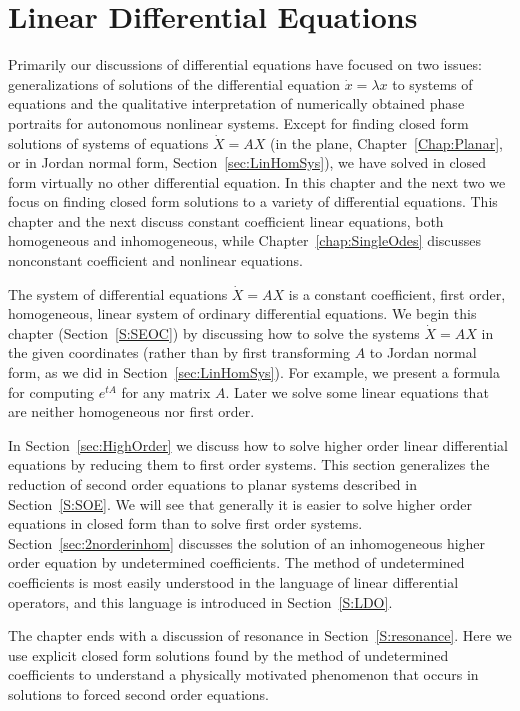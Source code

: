\chapter{Linear Differential Equations}
\label{C:LDE}

\normalsize

Primarily our discussions of differential equations have focused on 
two issues: generalizations of solutions of the differential equation 
$\dot{x}=\lambda x$ to systems of equations and the qualitative 
interpretation of numerically obtained phase portraits for autonomous
nonlinear systems.   Except for finding closed form solutions of 
systems of equations $\dot{X}=AX$ (in the plane, Chapter~\ref{Chap:Planar}, 
or in Jordan normal form, Section~\ref{sec:LinHomSys}), we have solved in 
closed form virtually no other differential equation.  In this chapter and 
the next two we focus on finding closed form solutions to a variety of 
differential equations.  This chapter and the next discuss constant 
coefficient linear equations, both homogeneous and inhomogeneous, 
while Chapter~\ref{chap:SingleOdes} discusses nonconstant coefficient
and nonlinear equations.  

The system of differential equations $\dot{X}=AX$ is a constant coefficient, 
first order, homogeneous, linear system of ordinary differential equations. 
We begin this chapter (Section~\ref{S:SEOC}) by discussing how to solve 
the systems $\dot{X}=AX$ in the given coordinates (rather than by first 
transforming $A$ to Jordan normal form, as we did in 
Section~\ref{sec:LinHomSys}).  For example, we present a formula for 
computing $e^{tA}$ for any matrix $A$.  Later we solve some linear 
equations that are neither homogeneous nor first order.   

In Section~\ref{sec:HighOrder} we discuss how to solve higher order 
linear differential equations by reducing them to first order systems.  
This section generalizes the reduction of second order equations to planar
systems described in Section~\ref{S:SOE}.  We will see that generally it is 
easier to solve higher order equations in closed form than to solve first 
order systems.  Section~\ref{sec:2norderinhom} discusses the solution of an 
inhomogeneous higher order equation by undetermined coefficients.  The method 
of undetermined coefficients is most easily understood in the language of 
linear differential operators, and this language is introduced in 
Section~\ref{S:LDO}.

The chapter ends with a discussion of resonance in Section~\ref{S:resonance}. 
Here we use explicit closed form solutions found by the method of 
undetermined coefficients to understand a physically motivated phenomenon 
that occurs in solutions to forced second order equations.  


